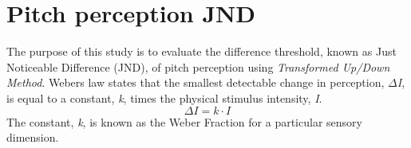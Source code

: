 \chapter*{Pitch perception JND}
The purpose of this study is to evaluate the difference threshold, known as Just Noticeable Difference (JND), of pitch perception using \textit{Transformed Up/Down Method}. Webers law states that the smallest detectable change in perception, $\Delta$\textit{I}, is equal to a constant, \textit{k}, times the physical stimulus intensity, \textit{I}.
%
\begin{equation}
\Delta I= k \cdot I
\end{equation}
%
The constant, \textit{k}, is known as the Weber Fraction for a particular sensory dimension.